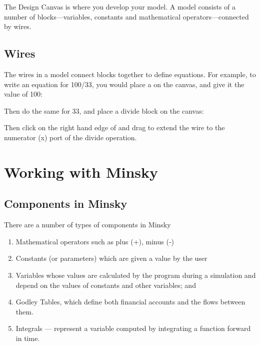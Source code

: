 The Design Canvas is where you develop your model. A model consists of
a number of blocks---variables, constants and mathematical
operators---connected by wires. 


\subsection{Wires}
\label{Wires}

The wires in a model connect blocks together to define equations. For
example, to write an equation for 100/33, you would place a
 on the canvas, and give it the value of 100:

\begin{center}
\end{center}

Then do the same for 33, and place a divide block on the canvas:

\begin{center}
\end{center}

Then click on the right hand edge of 
and drag to extend the wire to the numerator (x) port of the divide operation.

\section{Working with Minsky}

\subsection{Components in Minsky}

There are a number of types of components in Minsky
\begin{enumerate}
\item Mathematical operators such as plus (+), minus (-)
\item Constants (or parameters) which are given a value by the user
\item Variables whose values are calculated by the program during a simulation and depend on the values of constants and other variables; and
\item Godley Tables, which define both financial accounts and the
flows between them.
\item Integrals --- represent a variable computed by integrating a
function forward in time.
\end{enumerate}


